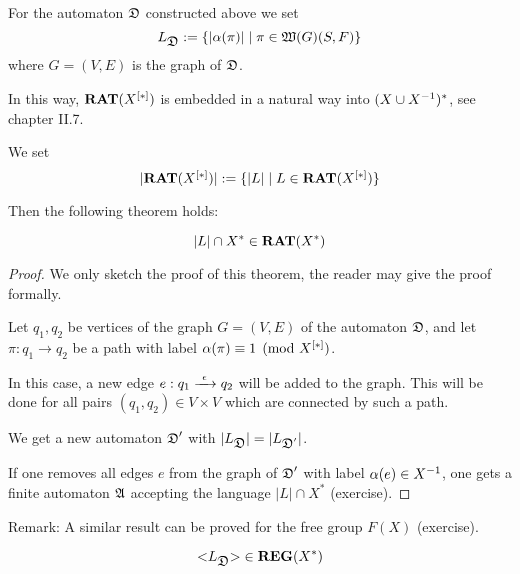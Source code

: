 For the automaton $\mbox{$\mathfrak{D}$}$ constructed above we set
\[ L_{\mbox{$\mathfrak{D}$}} := \mbox{$\{|\alpha(\pi)| \mid \pi \in \mbox{$\mathfrak{W}({G})$}(S, F)\}$} \]
where $G = (V, E)$ is the graph of $\mbox{$\mathfrak{D}$}$.

In this way, $\mbox{{\bf RAT}}(\mbox{${X}^{[*]}$})$ is embedded in a natural way into
$(X \cup {X}^{-1})^*$, see chapter II.7.

We set
\[ |\mbox{{\bf RAT}}(\mbox{${X}^{[*]}$})| := \mbox{$\{|L| \mid L \in \mbox{{\bf RAT}}(\mbox{${X}^{[*]}$})\}$} \]

Then the following theorem holds:

\begin{theorem}
\[ |L| \cap X^* \in \mbox{{\bf RAT}}(X^*) \]
\end{theorem}

\begin{proof}
We only sketch the proof of this theorem, the reader may give the proof
formally.

Let $q_1, q_2$ be vertices of the graph $G = (V, E)$ of the automaton $\mbox{$\mathfrak{D}$}$,
and let $\pi: q_1 \to q_2$ be a path with label $\alpha(\pi) \equiv 1
\pmod{\mbox{${X}^{[*]}$}}$.

In this case, a new edge $e: q_1 \xrightarrow{\ {\epsilon}\ } q_2$ will be added to the
graph. This will be done for all pairs $(q_1, q_2) \in V \times V$ which are
connected by such a path.

We get a new automaton $\mbox{$\mathfrak{D}$}'$ with $|L_{\mbox{$\mathfrak{D}$}}| = |L_{\mbox{$\mathfrak{D}$}'}|$.

If one removes all edges $e$ from the graph of $\mbox{$\mathfrak{D}$}'$ with label 
$\alpha(e) \in {{X}^{-1}}$, one gets a finite automaton $\mbox{$\mathfrak{A}$}$ accepting the 
language $|L| \cap X^*$ (exercise).
\end{proof}

Remark: A similar result can be proved for the free group $F(X)$
(exercise).

\bigskip
\begin{theorem}
\[ \mbox{${<}{L_{\mbox{$\mathfrak{D}$}}}{>}$} \in \mbox{{\bf REG}}(X^*) \]
\end{theorem}

